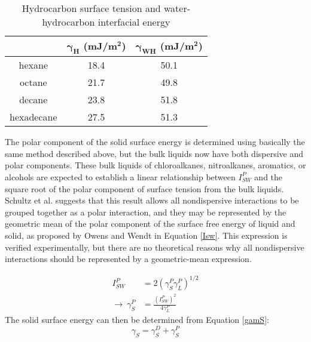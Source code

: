 \begin{table}[h!]
	\centering
	\caption{Hydrocarbon surface tension and water-hydrocarbon interfacial energy}
	\begin{tabular} { |c||c|c|  } %
		\hline
		\textbf{\nalk[s]}	&\textbf{$\bm{\gamma_{H}}$ (mJ/m$\bm{^{2}}$)}	&\textbf{$\bm{\gamma_{WH}}$ (mJ/m$\bm{^{2}}$)}	\\
		\hline
		hexane		&18.4	&50.1 \\
		\hline
		octane		&21.7	&49.8 \\
		\hline
		decane		&23.8	&51.8 \\
		\hline
		hexadecane	&27.5	&51.3 \\
		\hline
	\end{tabular}
	\label{knownsurften}
\end{table}


The polar component of the solid surface energy is determined using basically the same method described above,\cite{Schultz1977} but the bulk liquids now have both dispersive and polar components. These bulk liquids of chloroalkanes, nitroalkanes, aromatics, or alcohols are expected to establish a linear relationship between $I_{SW}^{P} $ and the square root of the polar component of surface tension from the bulk liquids. Schultz et al. suggests that this result allows all nondispersive interactions to be grouped together as a polar interaction, and they may be represented by the geometric mean of the polar component of the surface free energy of liquid and solid, as proposed by Owens and Wendt in Equation \ref{Isw}. This expression is verified experimentally, but there are no theoretical reasons why all nondispersive interactions should be represented by a geometric-mean expression.\cite{Fowkes1964}

\begin{equation}
\label{Isw}
	\begin{split}
	I_{SW}^{P} 							& = 2 (\gamma_{S}^{P}\gamma_{L}^{P})^{1/2} \\
	\rightarrow ~ \gamma_{S}^{P}	& = \frac{(I_{SW}^{P})^{2} }{4\gamma_{L}^{P}} 
	\end{split}
\end{equation}
The solid surface energy can then be determined from Equation \ref{gamS}:
\begin{equation}
\label{gamS}	\gamma_{S} = \gamma_{S}^{D} + \gamma_{S}^{P}	
\end{equation}


